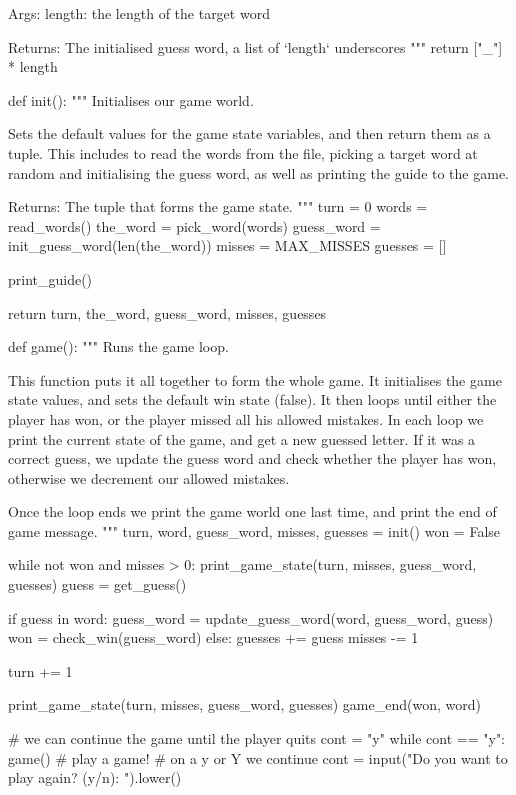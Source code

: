{\begin{python}
    Args:
        length: the length of the target word
    
    Returns:
        The initialised guess word, a list of `length` underscores
    """
    return ["_"] * length


def init():
    """
    Initialises our game world.

    Sets the default values for the game state variables, and then return
    them as a tuple. This includes to read the words from the file, picking
    a target word at random and initialising the guess word, as well as
    printing the guide to the game.

    Returns:
        The tuple that forms the game state.
    """
    turn = 0
    words = read_words()
    the_word = pick_word(words)
    guess_word = init_guess_word(len(the_word))
    misses = MAX_MISSES
    guesses = []

    print_guide()

    return turn, the_word, guess_word, misses, guesses


def game():
    """
    Runs the game loop.

    This function puts it all together to form the whole game. It initialises
    the game state values, and sets the default win state (false).
    It then loops until either the player has won, or the player missed all
    his allowed mistakes.
    In each loop we print the current state of the game, and get a new guessed
    letter. If it was a correct guess, we update the guess word and check
    whether the player has won, otherwise we decrement our allowed mistakes.

    Once the loop ends we print the game world one last time, and print
    the end of game message.
    """
    turn, word, guess_word, misses, guesses = init()
    won = False

    while not won and misses > 0:
        print_game_state(turn, misses, guess_word, guesses)
        guess = get_guess()

        if guess in word:
            guess_word = update_guess_word(word, guess_word, guess)
            won = check_win(guess_word)
        else:
            guesses += guess
            misses -= 1
        
        turn += 1

    print_game_state(turn, misses, guess_word, guesses)
    game_end(won, word)


# we can continue the game until the player quits
cont = "y"
while cont == "y":
    game() # play a game!
    # on a y or Y we continue
    cont = input("Do you want to play again? (y/n): ").lower()
\end{python}
}


